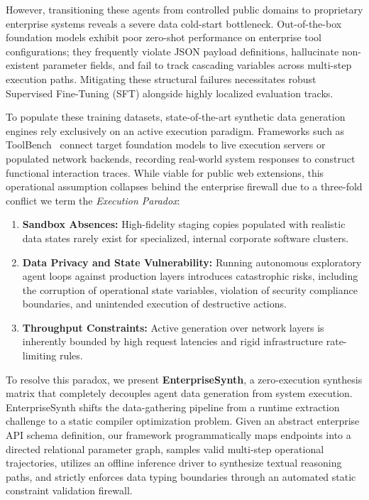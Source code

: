 \documentclass[11pt]{article}
\begin{document}
However, transitioning these agents from controlled public domains to proprietary enterprise
systems reveals a severe data cold-start bottleneck. Out-of-the-box foundation models exhibit poor
zero-shot performance on enterprise tool configurations; they frequently violate JSON payload
definitions, hallucinate non-existent parameter fields, and fail to track cascading variables
across multi-step execution paths. Mitigating these structural failures necessitates robust
Supervised Fine-Tuning (SFT) alongside highly localized evaluation tracks.

To populate these training datasets, state-of-the-art synthetic data generation engines rely
exclusively on an active execution paradigm. Frameworks such as ToolBench~\cite{qin2023toolbench}
connect target foundation models to live execution servers or populated network backends,
recording real-world system responses to construct functional interaction traces. While viable
for public web extensions, this operational assumption collapses behind the enterprise firewall
due to a three-fold conflict we term the \textit{Execution Paradox}:
\begin{enumerate}
    \item \textbf{Sandbox Absences:} High-fidelity staging copies populated with realistic data
    states rarely exist for specialized, internal corporate software clusters.
    \item \textbf{Data Privacy and State Vulnerability:} Running autonomous exploratory agent loops
    against production layers introduces catastrophic risks, including the corruption of
    operational state variables, violation of security compliance boundaries, and unintended
    execution of destructive actions.
    \item \textbf{Throughput Constraints:} Active generation over network layers is inherently
    bounded by high request latencies and rigid infrastructure rate-limiting rules.
\end{enumerate}

To resolve this paradox, we present \textbf{EnterpriseSynth}, a zero-execution synthesis matrix
that completely decouples agent data generation from system execution. EnterpriseSynth shifts the
data-gathering pipeline from a runtime extraction challenge to a static compiler optimization
problem. Given an abstract enterprise API schema definition, our framework programmatically maps
endpoints into a directed relational parameter graph, samples valid multi-step operational
trajectories, utilizes an offline inference driver to synthesize textual reasoning paths, and
strictly enforces data typing boundaries through an automated static constraint validation
firewall.
\end{document}
